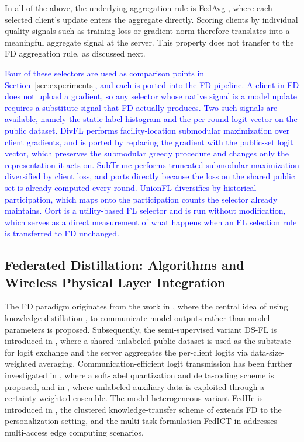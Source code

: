 \documentclass[journal]{IEEEtran}
\newcommand{\rev}[1]{\textcolor{blue}{#1}}
\begin{document}
In all of the above, the underlying aggregation rule is FedAvg \cite{mcmahan2017communication}, where each selected client's update enters the aggregate directly. Scoring clients by individual quality signals such as training loss or gradient norm therefore translates into a meaningful aggregate signal at the server. This property does not transfer to the FD aggregation rule, as discussed next.

\rev{Four of these selectors are used as comparison points in Section~\ref{sec:experiments}, and each is ported into the FD pipeline. A client in FD does not upload a gradient, so any selector whose native signal is a model update requires a substitute signal that FD actually produces. Two such signals are available, namely the static label histogram and the per-round logit vector on the public dataset. DivFL \cite{balakrishnan2022divfl} performs facility-location submodular maximization over client gradients, and is ported by replacing the gradient with the public-set logit vector, which preserves the submodular greedy procedure and changes only the representation it acts on. SubTrunc \cite{castillo2025subtrunc} performs truncated submodular maximization diversified by client loss, and ports directly because the loss on the shared public set is already computed every round. UnionFL \cite{castillo2025subtrunc} diversifies by historical participation, which maps onto the participation counts the selector already maintains. Oort \cite{lai2021oort} is a utility-based FL selector and is run without modification, which serves as a direct measurement of what happens when an FL selection rule is transferred to FD unchanged.}

\subsection{Federated Distillation: Algorithms and Wireless Physical Layer Integration}
\label{ssec:rw-fd}

The FD paradigm originates from the work in \cite{jeong2018communication}, where the central idea of using knowledge distillation \cite{hinton2015distilling}, \cite{wang2022kd} to communicate model outputs rather than model parameters is proposed. Subsequently, the semi-supervised variant DS-FL is introduced in \cite{itahara2023distillation}, where a shared unlabeled public dataset is used as the substrate for logit exchange and the server aggregates the per-client logits via data-size-weighted averaging. Communication-efficient logit transmission has been further investigated in \cite{sattler2022cfd}, where a soft-label quantization and delta-coding scheme is proposed, and in \cite{sattler2023fedaux}, where unlabeled auxiliary data is exploited through a certainty-weighted ensemble. The model-heterogeneous variant FedHe is introduced in \cite{chan2021fedhe}, the clustered knowledge-transfer scheme of \cite{cho2023clustered} extends FD to the personalization setting, and the multi-task formulation FedICT in \cite{wu2024fedict} addresses multi-access edge computing scenarios.
\end{document}

